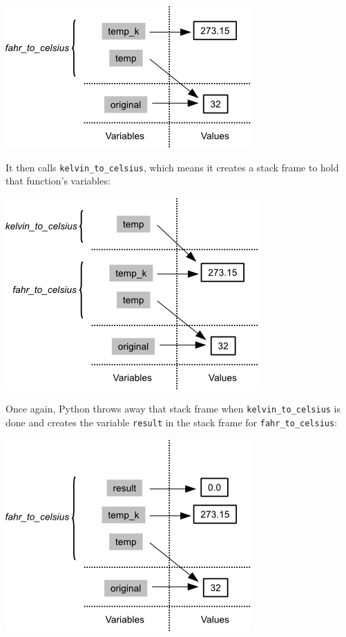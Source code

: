 \documentclass[]{book}
\begin{document}
\includegraphics{novice/python/img/python-call-stack-04.png}

It then calls \texttt{kelvin\_to\_celsius}, which means it creates a
stack frame to hold that function's variables:

\includegraphics{novice/python/img/python-call-stack-05.png}

Once again, Python throws away that stack frame when
\texttt{kelvin\_to\_celsius} is done and creates the variable
\texttt{result} in the stack frame for \texttt{fahr\_to\_celsius}:

\includegraphics{novice/python/img/python-call-stack-06.png}
\end{document}
